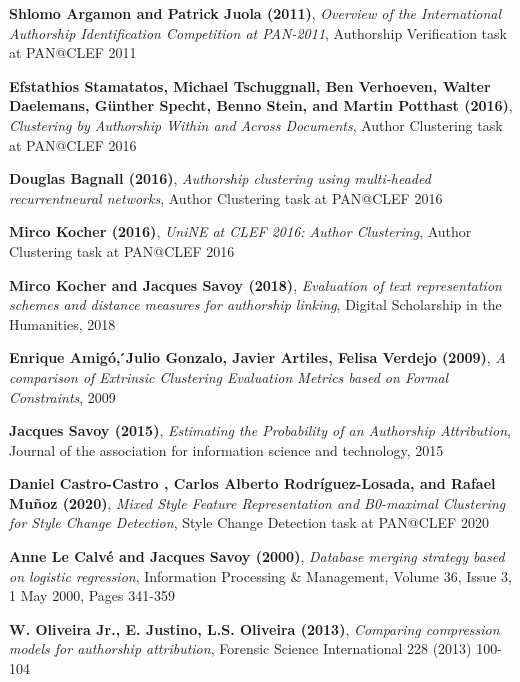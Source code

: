 \begin{thebibliography}{9}

\textbf{Shlomo Argamon and Patrick Juola (2011)},
\textit{Overview of the International Authorship Identification Competition at PAN-2011},
Authorship Verification task at PAN@CLEF 2011

\textbf{Efstathios Stamatatos, Michael Tschuggnall, Ben Verhoeven, Walter Daelemans, Günther Specht, Benno Stein, and Martin Potthast (2016)},
\textit{Clustering by Authorship Within and Across Documents},
Author Clustering task at PAN@CLEF 2016

\textbf{Douglas Bagnall (2016)},
\textit{Authorship clustering using multi-headed recurrentneural networks},
Author Clustering task at PAN@CLEF 2016

\textbf{Mirco Kocher (2016)},
\textit{UniNE at CLEF 2016: Author Clustering},
Author Clustering task at PAN@CLEF 2016

\textbf{Mirco Kocher and Jacques Savoy (2018)},
\textit{Evaluation of text representation schemes and distance measures for authorship linking},
Digital Scholarship in the Humanities, 2018

\textbf{Enrique Amigó, ́Julio Gonzalo, Javier Artiles, Felisa Verdejo (2009)},
\textit{A comparison of Extrinsic Clustering Evaluation Metrics based on Formal Constraints},
2009

\textbf{Jacques Savoy (2015)},
\textit{Estimating the Probability of an Authorship Attribution},
Journal of the association for information science and technology, 2015

\textbf{Daniel Castro-Castro , Carlos Alberto Rodríguez-Losada, and Rafael Muñoz (2020)},
\textit{Mixed Style Feature Representation and B0-maximal Clustering for Style Change Detection},
Style Change Detection task at PAN@CLEF 2020

\textbf{Anne Le Calvé and Jacques Savoy (2000)},
\textit{Database merging strategy based on logistic regression},
Information Processing \& Management, Volume 36, Issue 3, 1 May 2000, Pages 341-359

\textbf{W. Oliveira Jr., E. Justino, L.S. Oliveira (2013)},
\textit{Comparing compression models for authorship attribution},
Forensic Science International 228 (2013) 100-104


\end{thebibliography}
